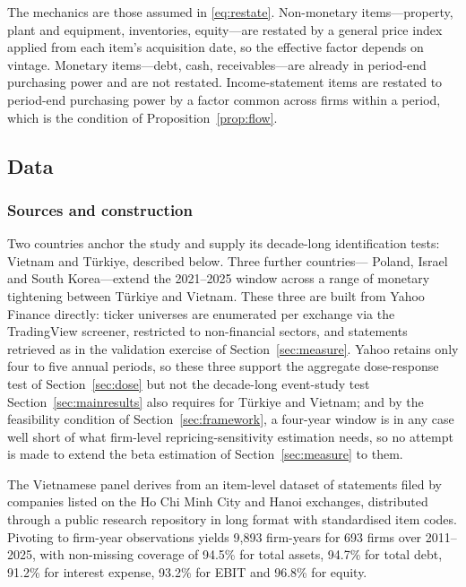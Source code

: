 \documentclass[review,12pt,authoryear]{elsarticle}
\theoremstyle{plain}
\theoremstyle{definition}
\begin{document}
The mechanics are those assumed in \eqref{eq:restate}. Non-monetary
items---property, plant and equipment, inventories, equity---are restated by a
general price index applied from each item's acquisition date, so the effective
factor depends on vintage. Monetary items---debt, cash, receivables---are
already in period-end purchasing power and are not restated. Income-statement
items are restated to period-end purchasing power by a factor common across
firms within a period, which is the condition of Proposition~\ref{prop:flow}.

\subsection{Data}
\label{sec:dataonly}


\subsubsection{Sources and construction}

Two countries anchor the study and supply its decade-long identification
tests: Vietnam and T\"{u}rkiye, described below. Three further countries---
Poland, Israel and South Korea---extend the 2021--2025 window across a range of
monetary tightening between T\"{u}rkiye and Vietnam. These three are built from
Yahoo Finance directly: ticker universes are enumerated per exchange via the
TradingView screener, restricted to non-financial sectors, and statements
retrieved as in the validation exercise of Section~\ref{sec:measure}. Yahoo
retains only four to five annual periods, so these three support the aggregate
dose-response test of Section~\ref{sec:dose} but not the decade-long
event-study test Section~\ref{sec:mainresults} also requires for T\"{u}rkiye and
Vietnam; and by the feasibility condition of Section~\ref{sec:framework}, a
four-year window is in any case well short of what firm-level
repricing-sensitivity estimation needs, so no attempt is made to extend the
beta estimation of Section~\ref{sec:measure} to them.


The Vietnamese panel derives from an item-level dataset of statements filed by
companies listed on the Ho Chi Minh City and Hanoi exchanges, distributed
through a public research repository in long format with standardised item
codes. Pivoting to firm-year observations yields 9{,}893 firm-years for 693
firms over 2011--2025, with non-missing coverage of 94.5\% for total assets,
94.7\% for total debt, 91.2\% for interest expense, 93.2\% for EBIT and 96.8\%
for equity.
\end{document}
